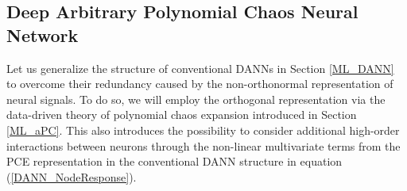 \documentclass[a4paper,fleqn]{article}
\newcommand{\rw}[1]{\textcolor{blue}{#1}}
\newcommand{\del}[1]{\textcolor{red}{\sout{#1}}}
\renewcommand{\del}[1]{}
\renewcommand{\rw}[1]{#1}
\begin{document}
\subsection{Deep Arbitrary Polynomial Chaos Neural Network}
\label{ML_DaPC}

Let us generalize the structure of conventional DANNs in Section \ref{ML_DANN} to overcome their redundancy \del{and non-ortho-} \del{normality in} \rw{caused by the non-orthonormal} representation of neural signals. To do so, we will employ the orthogonal representation via the data-driven theory of polynomial chaos expansion introduced in Section \ref{ML_aPC}. This also introduces the possibility to consider additional high-order interactions between neurons through the non-linear \del{linear} \rw{multivariate} terms from the PCE representation in the conventional DANN structure in equation (\ref{DANN_NodeResponse}). 
\end{document}
